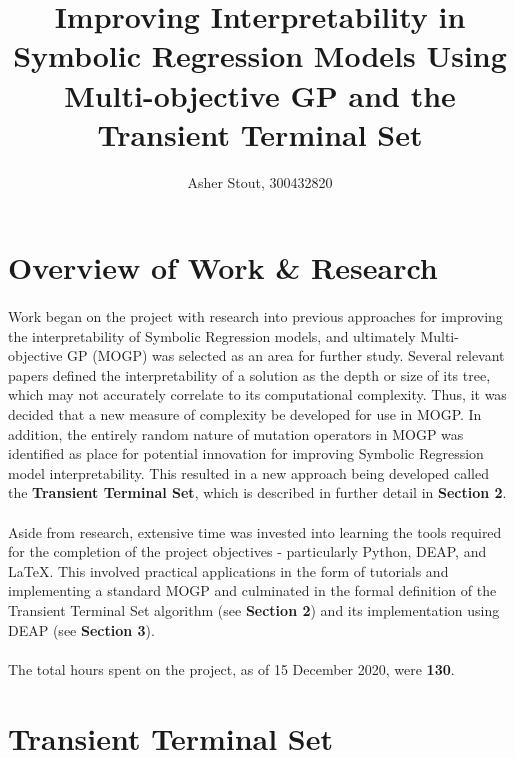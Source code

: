 \documentclass[a4paper]{article}
\title{Improving Interpretability in Symbolic Regression Models Using Multi-objective GP and the Transient Terminal Set}
\author{Asher Stout, 300432820}
\begin{document}
\maketitle

\section{Overview of Work \& Research}
\paragraph{} Work began on the project with research into previous approaches for improving the interpretability of Symbolic Regression models, and ultimately Multi-objective GP (MOGP) was selected as an area for further study. Several relevant papers defined the interpretability of a solution as the depth or size of its tree, which may not accurately correlate to its computational complexity. Thus, it was decided that a new measure of complexity be developed for use in MOGP. In addition, the entirely random nature of mutation operators in MOGP was identified as place for potential innovation for improving Symbolic Regression model interpretability. This resulted in a new approach being developed called the \textbf{Transient Terminal Set}, which is described in further detail in \textbf{Section 2}.
\paragraph{} Aside from research, extensive time was invested into learning the tools required for the completion of the project objectives - particularly Python, DEAP, and LaTeX. This involved practical applications in the form of tutorials and implementing a standard MOGP and culminated in the formal definition of the Transient Terminal Set algorithm (see \textbf{Section 2}) and its implementation using DEAP (see \textbf{Section 3}). 
\paragraph{}The total hours spent on the project, as of 15 December 2020, were \textbf{130}.

\section{Transient Terminal Set}
\end{document}
